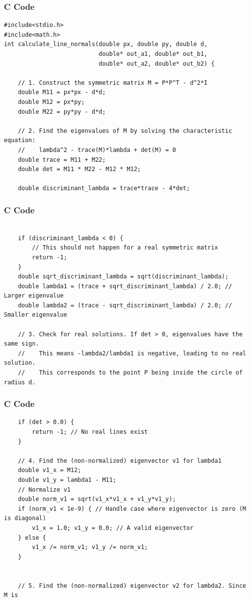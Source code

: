 \documentclass{beamer}
\begin{document}
\begin{frame}[fragile]
\frametitle{C Code}
\begin{lstlisting}
#include<stdio.h>
#include<math.h>
int calculate_line_normals(double px, double py, double d,
                           double* out_a1, double* out_b1,
                           double* out_a2, double* out_b2) {

    // 1. Construct the symmetric matrix M = P*P^T - d^2*I
    double M11 = px*px - d*d;
    double M12 = px*py;
    double M22 = py*py - d*d;

    // 2. Find the eigenvalues of M by solving the characteristic equation:
    //    lambda^2 - trace(M)*lambda + det(M) = 0
    double trace = M11 + M22;
    double det = M11 * M22 - M12 * M12;

    double discriminant_lambda = trace*trace - 4*det;
\end{lstlisting}    
\end{frame}
\begin{frame}[fragile]
\frametitle{C Code }
\begin{lstlisting}

    if (discriminant_lambda < 0) {
        // This should not happen for a real symmetric matrix
        return -1;
    }
    double sqrt_discriminant_lambda = sqrt(discriminant_lambda);
    double lambda1 = (trace + sqrt_discriminant_lambda) / 2.0; // Larger eigenvalue
    double lambda2 = (trace - sqrt_discriminant_lambda) / 2.0; // Smaller eigenvalue

    // 3. Check for real solutions. If det > 0, eigenvalues have the same sign.
    //    This means -lambda2/lambda1 is negative, leading to no real solution.
    //    This corresponds to the point P being inside the circle of radius d.
    \end{lstlisting}    
\end{frame}
\begin{frame}[fragile]
\frametitle{C Code }
\begin{lstlisting}
    if (det > 0.0) {
        return -1; // No real lines exist
    }

    // 4. Find the (non-normalized) eigenvector v1 for lambda1
    double v1_x = M12;
    double v1_y = lambda1 - M11;
    // Normalize v1
    double norm_v1 = sqrt(v1_x*v1_x + v1_y*v1_y);
    if (norm_v1 < 1e-9) { // Handle case where eigenvector is zero (M is diagonal)
        v1_x = 1.0; v1_y = 0.0; // A valid eigenvector
    } else {
        v1_x /= norm_v1; v1_y /= norm_v1;
    }


    // 5. Find the (non-normalized) eigenvector v2 for lambda2. Since M is
\end{lstlisting}    
\end{frame}
\end{document}
